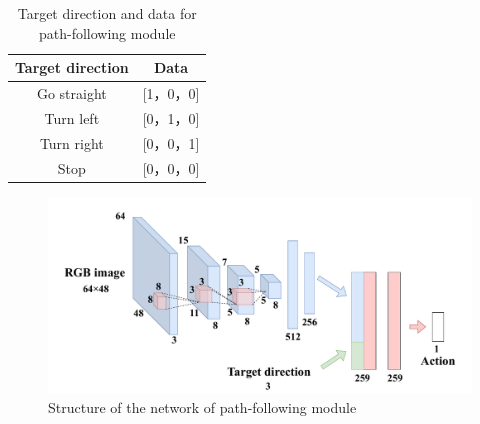 \begin{table}[htbp]
    \centering
    \caption{Target direction and data for path-following module}\label{tab:target}
    \begin{tabular}{|c|c|}
    \hline
    Target direction & Data        \\
    \hline
    Go straight   & {[}1，0，0{]} \\
    Turn left   & {[}0，1，0{]} \\
    Turn right   & {[}0，0，1{]} \\
    Stop   & {[}0，0，0{]}\\
    \hline
    \end{tabular}
    \end{table}
\begin{figure}[htbp]
    \centering
     \includegraphics[width=130mm]{images/pdf/imi_net.pdf}
     \caption{Structure of the network of path-following module}
     \label{fig:imi_net}
\end{figure}

